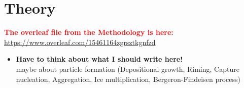 \chapter{Theory}
\textcolor{red}{\textbf{The overleaf file from the Methodology is here:} \\ \url{https://www.overleaf.com/15461164zgrsztkgnfzd}}
\\

\begin{itemize}
	\item \textbf{Have to think about what I should write here!} \\
		maybe about particle formation (Depositional growth, Riming, Capture nucleation, Aggregation, Ice multiplication, Bergeron-Findeisen process)
\end{itemize}








